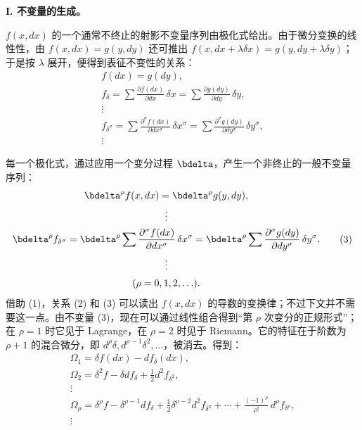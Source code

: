\begin{center}
\textbf{I. 不变量的生成。}
\end{center}

\(f(x,dx)\) 的一个通常不终止的射影不变量序列由极化式给出。由于微分变换的线性性，由 \(f(x,dx)=g(y,dy)\) 还可推出
\(f(x,dx+\lambda\delta x)=g(y,dy+\lambda\delta y)\)；于是按 \(\lambda\) 展开，便得到表征不变性的关系：
\begin{equation}
\begin{gathered}
f(dx)=g(dy),\\
f_\delta=\sum\frac{\partial f(dx)}{\partial dx}\,\delta x
       =\sum\frac{\partial g(dy)}{\partial dy}\,\delta y,\\
\vdots\\
f_{\delta^\sigma}=
\sum\frac{\partial^\sigma f(dx)}{\partial dx^\sigma}\,\delta x^\sigma
=
\sum\frac{\partial^\sigma g(dy)}{\partial dy^\sigma}\,\delta y^\sigma,\\
\vdots
\end{gathered}
\tag{2}
\end{equation}

每一个极化式，通过应用一个变分过程 \(\bdelta\)，产生一个非终止的一般不变量序列：
\begin{equation}
\begin{gathered}
\bdelta^\rho f(x,dx)=\bdelta^\rho g(y,dy),\\
\vdots\\
\bdelta^\rho f_{\delta^\sigma}
=\bdelta^\rho\sum\frac{\partial^\sigma f(dx)}{\partial dx^\sigma}\,
\delta x^\sigma
=\bdelta^\rho\sum\frac{\partial^\sigma g(dy)}{\partial dy^\sigma}\,
\delta y^\sigma,\\
\vdots\\[0.2em]
(\rho=0,1,2,\ldots).
\end{gathered}
\tag{3}
\end{equation}
借助 (1)，关系 (2) 和 (3) 可以读出 \(f(x,dx)\) 的导数的变换律；不过下文并不需要这一点。由不变量 (3)，现在可以通过线性组合得到“第 \(\rho\) 次变分的正规形式”；在 \(\rho=1\) 时它见于 Lagrange，在 \(\rho=2\) 时见于 Riemann。它的特征在于阶数为 \(\rho+1\) 的混合微分，即 \(d^\rho\delta,d^{\rho-1}\delta^2,\ldots\)，被消去。得到：
\begin{equation}
\begin{gathered}
\Omega_1=\delta f(dx)-d f_\delta(dx),\\
\Omega_2=\delta^2 f-\delta d f_\delta+\frac12 d^2 f_{\delta^2},\\
\vdots\\
\Omega_\rho=\delta^\rho f-\delta^{\rho-1}d f_\delta
+\frac12\delta^{\rho-2}d^2 f_{\delta^2}
+\cdots+\frac{(-1)^\rho}{\rho!}\,d^\rho f_{\delta^\rho},\\
\vdots
\end{gathered}
\tag{4}
\end{equation}

